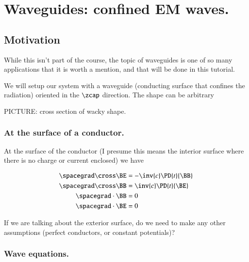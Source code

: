 %
%

\chapter{Waveguides: confined EM waves.}
\label{chap:relativisticElectrodynamicsT4}
{}
\date{Mar 3, 2011}

\beginArtWithToc

\section{Motivation}

While this isn't part of the course, the topic of waveguides is one of so many applications that it is worth a mention, and that will be done in this tutorial.

We will setup our system with a waveguide (conducting surface that confines the radiation) oriented in the $\zcap$ direction.  The shape can be arbitrary

PICTURE: cross section of wacky shape.

\subsection{At the surface of a conductor.}

At the surface of the conductor (I presume this means the interior surface where there is no charge or current enclosed) we have

\begin{align}\label{eqn:relativisticElectrodynamicsT4:10}
\spacegrad \cross \BE &= - \inv{c} \PD{t}{\BB} \\
\spacegrad \cross \BB &= \inv{c} \PD{t}{\BE} \\
\spacegrad \cdot \BB &= 0 \\
\spacegrad \cdot \BE &= 0
\end{align}

If we are talking about the exterior surface, do we need to make any other assumptions (perfect conductors, or constant potentials)?

\subsection{Wave equations.}

